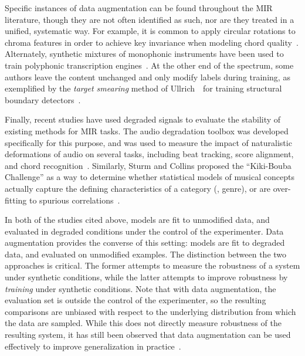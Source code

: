 \documentclass{article}
\begin{document}
%
Specific instances of data augmentation can be found throughout the MIR literature,
though they are not often identified as such, nor are they treated in a unified,
systematic way.  For example, it is common to apply circular rotations to chroma features 
in order to achieve key invariance when modeling chord quality~\cite{lee2008acoustic}.
Alternately, synthetic mixtures of monophonic instruments have been used 
to train polyphonic transcription engines~\cite{kirchhoff2012multi}.
At the other end of the spectrum, some authors leave the content unchanged and 
only modify labels during training, as exemplified by the \emph{target smearing} 
method of Ullrich~\etal\ for training structural boundary 
detectors~\cite{ullrich2014boundary}.

%   
%   
Finally, recent studies have used degraded signals to evaluate the stability of
existing methods for MIR tasks.
The audio degradation toolbox was developed specifically for this purpose, and was used
to measure the impact of naturalistic deformations of audio on several tasks, including
beat tracking, score alignment, and chord recognition~\cite{mauch2013audio}.
Similarly, Sturm and Collins proposed the ``Kiki-Bouba Challenge'' as a way to determine
whether statistical models of musical concepts actually capture the defining
characteristics of a category (\eg, genre), or are over-fitting to spurious
correlations~\cite{sturmkiki}.

In both of the studies cited above, models are fit to unmodified data, and evaluated in
degraded conditions under the control of the experimenter.  
Data augmentation provides the converse of this setting: models are fit to degraded data, 
and evaluated on unmodified examples.  The distinction between the two approaches is
critical.  The former attempts to measure the robustness of a system under synthetic
conditions, while the latter attempts to improve robustness by \emph{training} under
synthetic conditions. Note that with data augmentation, the evaluation set is outside 
the control of the experimenter, so the resulting comparisons are unbiased with respect
to the underlying distribution from which the data are sampled.  While this does not
directly measure robustness of the resulting system, it has still been observed that data
augmentation can be used effectively to improve generalization in
practice~\cite{krizhevsky2012imagenet}.
\end{document}
